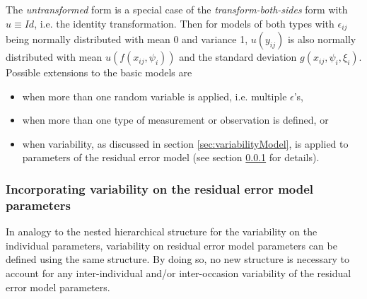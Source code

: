 The \textit{untransformed} form is a special case of the \textit{transform-both-sides} form with $u \equiv Id$, i.e. the identity transformation.
Then for models of both types with $\epsilon_{ij}$ being normally distributed with mean 0 and variance 1, $u(y_{ij})$ is also normally distributed
with mean $u(f(x_{ij}, \psi_{i}))$ and the standard deviation $g(x_{ij}, \psi_{i}, \xi_i)$. \\
Possible extensions to the basic models are
\begin{itemize}
\item
when more than one random variable is applied, i.e. multiple $\epsilon$'s,
\item
when more than one type of measurement or observation is defined, or
\item
when variability, as discussed in section \ref{sec:variabilityModel}, is applied to parameters of the residual error model (see section \ref{subsec:varModelResidualError} for details).
\end{itemize}


\subsubsection{Incorporating variability on the residual error model parameters}
\label{subsec:varModelResidualError}
In analogy to the nested hierarchical structure for the variability on the individual parameters,
variability on residual error model parameters can be defined using the same structure.
By doing so, no new structure is necessary to account for any inter-individual and/or inter-occasion variability of the residual error model parameters.

